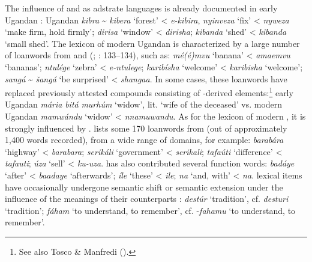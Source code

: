 \documentclass[output=paper]{langsci/langscibook}
\begin{document}
The influence of  and  as {adstrate} languages is already documented in early Ugandan  \citep{Avram2017talk}: Ugandan  \textit{kibra} {\textasciitilde} \textit{kibera} ‘forest’ <  \textit{e-kibira}, \textit{nyinveza} ‘fix’ <  \textit{nyweza} ‘make firm, hold firmly’; \textit{dirisa} ‘window’ <  \textit{dirisha}; \textit{kibanda} ‘shed’ <  \textit{kibanda} ‘small shed’. The lexicon of modern Ugandan  is characterized by a large number of {loanwords} from  and  (\citealt{Wellens2003}; \citealt{Nakao2012}: 133–134), such as: \textit{mé(é}\textit{)mvu} ‘banana’ <  \textit{amaemvu} ‘bananas’; \textit{ntulége} ‘zebra’ <  \textit{e-ntulege}; \textit{karibísha} ‘welcome’ <  \textit{karibisha} ‘welcome’; \textit{sangá} {\textasciitilde}  \textit{šangá} ‘be surprised’ <  \textit{shangaa}. In some cases, these {loanwords} have replaced previously attested {compounds} consisting of -derived elements:\footnote{See also Tosco \& Manfredi (\citeyear[509]{ToscoManfredi2013}).} early Ugandan  \textit{mária} \textit{bitá} \textit{murhúm} ‘widow’, lit. ‘wife of the deceased’ vs. modern Ugandan  \textit{mamwándu} ‘widow’ <  \textit{nnamuwandu}. As for the lexicon of modern , it is strongly influenced by . \citet{Luffin2004} lists some 170 {loanwords} from  (out of approximately 1,400 words recorded), from a wide range of domains, for example: \textit{barabára} ‘highway’ <  \textit{barabara}; \textit{serikáli} ‘government’ <  \textit{serikali}; \textit{tafaúti} ‘difference’ <  \textit{tafauti}; \textit{úza} ‘sell’ <  \textit{ku-uza}.  has also contributed several function words: \textit{badáye} ‘after’ <  \textit{baadaye} ‘afterwards’; \textit{íle} ‘these’ <  \textit{ile}; \textit{na} ‘and, with’ <  \textit{na}.  lexical items have occasionally undergone semantic shift or semantic {extension} under the influence of the meanings of their  counterparts \citep[315]{Luffin2014}: \textit{destúr} ‘tradition’, cf.  \textit{desturi} ‘tradition’; \textit{fáham} ‘to understand, to remember’, cf.  -\textit{fahamu} ‘to understand, to remember’. 
\end{document}
